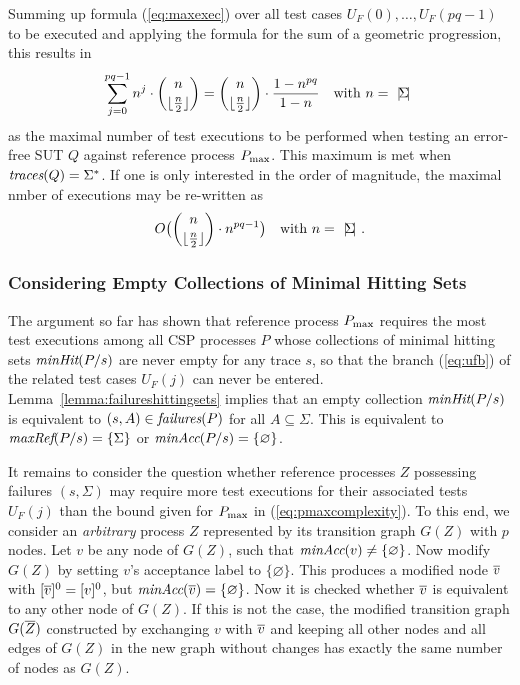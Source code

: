 Summing up  formula 
(\ref{eq:maxexec}) over all test cases $U_F(0),\dots,U_F(pq-1)$ to be executed and applying the formula for the sum of a geometric progression,  this results in
%
\begin{equation}\label{eq:pmaxcomplexity}
\sum_{j=0}^{pq-1} n^{j}\cdot \binom{n}{\lfloor\frac{n}{2}\rfloor}  = 
\binom{n}{\lfloor\frac{n}{2}\rfloor}\cdot\frac{1-n^{pq}}{1-n}\quad\text{with $n={~|\! \Sigma\!|~}$}
\end{equation}
%
as the maximal number of test executions to be performed when testing an error-free
SUT $Q$ against reference process $P_\text{max}$. This maximum is met when $\text{\it traces}(Q) = \Sigma^*$.
If one is only interested in the order of magnitude, the maximal nmber of executions 
may be re-written as 
%
\begin{equation} 
\label{eq:maxO}
O\big(\binom{n}{\lfloor\frac{n}{2}\rfloor}\cdot n^{pq-1}\big)\quad\text{with $n={~|\! \Sigma\!|~}$}.
\end{equation} 


\subsubsection*{Considering Empty Collections of Minimal Hitting Sets} 

The argument so far has shown that reference process $P_\text{max}$ requires the most test 
executions among all CSP processes $P$ whose collections of minimal hitting sets  
$\text{\it minHit}(P/s)$ are never empty for any trace $s$, so that the branch 
(\ref{eq:ufb}) of the related test cases $U_F(j)$ can never be entered.  
Lemma~\ref{lemma:failureshittingsets} implies that an empty collection 
$\text{\it minHit}(P/s)$
is equivalent to $(s,A)\in\text{\it failures}(P)$ for all $A\subseteq\Sigma$. This is equivalent to
$\text{\it maxRef}(P/s) = \{ \Sigma \}$ or $\text{\it minAcc}(P/s) = \{ \varnothing\}$.

It remains to 
consider the question whether reference processes $Z$ possessing failures $(s,\Sigma)$
may require more test executions for their associated tests $U_F(j)$ than the bound
given for $P_\text{max}$ in (\ref{eq:pmaxcomplexity}). To this end, we consider an {\it arbitrary} process  $Z$ represented by its transition graph $G(Z)$ with $p$ nodes. 
Let $v$ be any node of $G(Z)$, such 
that $\text{\it minAcc}(v)\neq\{\varnothing \}$. Now modify $G(Z)$ by setting $v$'s acceptance label
to $\{\varnothing \}$. This produces a modified node $\overline v$ with $[\overline v]^0=[v]^0$, but
$\text{\it minAcc}(\overline v)=\{\varnothing \}$. Now it is checked whether $\overline v$ is equivalent to any other node of $G(Z)$. If this is not the case, the modified transition graph $G(\overline Z)$ constructed by
exchanging $v$ with $\overline v$ and keeping all other nodes and all edges of $G(Z)$  in the new graph without changes has exactly the same number of nodes as $G(Z)$.

